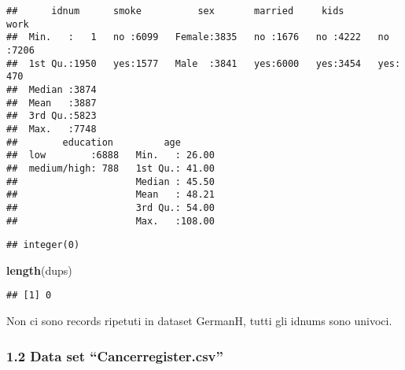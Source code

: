 \documentclass[]{article}
\newenvironment{Shaded}{\begin{snugshade}}{\end{snugshade}}
\newcommand{\KeywordTok}[1]{\textcolor[rgb]{0.13,0.29,0.53}{\textbf{#1}}}
\newcommand{\NormalTok}[1]{#1}
\newcommand{\OperatorTok}[1]{\textcolor[rgb]{0.81,0.36,0.00}{\textbf{#1}}}
\newcommand{\StringTok}[1]{\textcolor[rgb]{0.31,0.60,0.02}{#1}}
\begin{document}
\begin{verbatim}
##      idnum      smoke          sex       married     kids       work     
##  Min.   :   1   no :6099   Female:3835   no :1676   no :4222   no :7206  
##  1st Qu.:1950   yes:1577   Male  :3841   yes:6000   yes:3454   yes: 470  
##  Median :3874                                                            
##  Mean   :3887                                                            
##  3rd Qu.:5823                                                            
##  Max.   :7748                                                            
##        education         age        
##  low        :6888   Min.   : 26.00  
##  medium/high: 788   1st Qu.: 41.00  
##                     Median : 45.50  
##                     Mean   : 48.21  
##                     3rd Qu.: 54.00  
##                     Max.   :108.00
\end{verbatim}

\begin{Shaded}
\end{Shaded}

\begin{verbatim}
## integer(0)
\end{verbatim}

\begin{Shaded}
\begin{Highlighting}[]
\KeywordTok{length}\NormalTok{(dups)}
\end{Highlighting}
\end{Shaded}

\begin{verbatim}
## [1] 0
\end{verbatim}

Non ci sono records ripetuti in dataset GermanH, tutti gli idnums sono
univoci.

\hypertarget{data-set-cancerregister.csv}{%
\subsubsection{1.2 Data set
``Cancerregister.csv''}\label{data-set-cancerregister.csv}}
\end{document}
